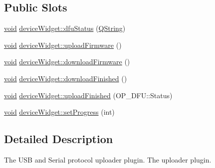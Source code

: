 \subsection*{\-Public \-Slots}
\begin{DoxyCompactItemize}
\item 
\hyperlink{group___u_a_v_objects_plugin_ga444cf2ff3f0ecbe028adce838d373f5c}{void} \hyperlink{group___uploader_gac421d53cac355c47f763a62eab7675c1}{device\-Widget\-::dfu\-Status} (\hyperlink{group___u_a_v_objects_plugin_gab9d252f49c333c94a72f97ce3105a32d}{\-Q\-String})
\item 
\hyperlink{group___u_a_v_objects_plugin_ga444cf2ff3f0ecbe028adce838d373f5c}{void} \hyperlink{group___uploader_ga51b53782cd70711b9ca91f81ef02565b}{device\-Widget\-::upload\-Firmware} ()
\item 
\hyperlink{group___u_a_v_objects_plugin_ga444cf2ff3f0ecbe028adce838d373f5c}{void} \hyperlink{group___uploader_ga988f01d143265ee96b4255b07b63fbf6}{device\-Widget\-::download\-Firmware} ()
\item 
\hyperlink{group___u_a_v_objects_plugin_ga444cf2ff3f0ecbe028adce838d373f5c}{void} \hyperlink{group___uploader_ga0809fb3c0a799a12c92704a36d3abf16}{device\-Widget\-::download\-Finished} ()
\item 
\hyperlink{group___u_a_v_objects_plugin_ga444cf2ff3f0ecbe028adce838d373f5c}{void} \hyperlink{group___uploader_ga671fb25fd918e7eeac5c16bd1f1dfe86}{device\-Widget\-::upload\-Finished} (\-O\-P\-\_\-\-D\-F\-U\-::\-Status)
\item 
\hyperlink{group___u_a_v_objects_plugin_ga444cf2ff3f0ecbe028adce838d373f5c}{void} \hyperlink{group___uploader_ga8ac75c9483f273ed59faa116fe5699ee}{device\-Widget\-::set\-Progress} (int)
\end{DoxyCompactItemize}


\subsection{\-Detailed \-Description}
\-The \-U\-S\-B and \-Serial protocol uploader plugin. \-The uploader plugin. 

